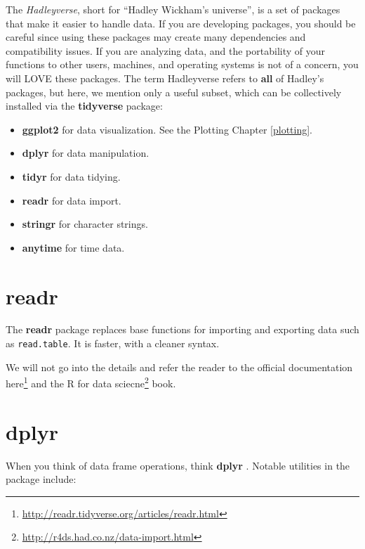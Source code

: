 \documentclass[]{book}
\providecommand{\tightlist}{%
  \setlength{\itemsep}{0pt}\setlength{\parskip}{0pt}}
\renewcommand{\href}[2]{#2\footnote{\url{#1}}}
\theoremstyle{definition}
\theoremstyle{definition}
\theoremstyle{definition}
\theoremstyle{remark}
\begin{document}
The \emph{Hadleyverse}, short for ``Hadley Wickham's universe'', is a set of packages that make it easier to handle data.
If you are developing packages, you should be careful since using these packages may create many dependencies and compatibility issues.
If you are analyzing data, and the portability of your functions to other users, machines, and operating systems is not of a concern, you will LOVE these packages.
The term Hadleyverse refers to \textbf{all} of Hadley's packages, but here, we mention only a useful subset, which can be collectively installed via the \textbf{tidyverse} package:

\begin{itemize}
\tightlist
\item
  \textbf{ggplot2} for data visualization. See the Plotting Chapter \ref{plotting}.
\item
  \textbf{dplyr} for data manipulation.
\item
  \textbf{tidyr} for data tidying.
\item
  \textbf{readr} for data import.
\item
  \textbf{stringr} for character strings.
\item
  \textbf{anytime} for time data.
\end{itemize}

\hypertarget{readr}{%
\section{readr}\label{readr}}

The \textbf{readr} package \citep{readr} replaces base functions for importing and exporting data such as \texttt{read.table}.
It is faster, with a cleaner syntax.

We will not go into the details and refer the reader to the official documentation \href{http://readr.tidyverse.org/articles/readr.html}{here} and the \href{http://r4ds.had.co.nz/data-import.html}{R for data sciecne} book.

\hypertarget{dplyr}{%
\section{dplyr}\label{dplyr}}

When you think of data frame operations, think \textbf{dplyr} \citep{dplyr}.
Notable utilities in the package include:
\end{document}
